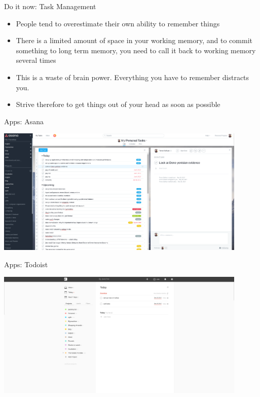 \documentclass[10pt]{beamer}
\begin{document}
\begin{frame}[c]{Do it now: Task Management}
    \begin{itemize}[<+->]
    	\item People tend to overestimate their own ability to remember things
    	\item There is a limited amount of space in your working memory, and to commit something to long term memory, you need to call it back to working memory several times
    	\item This is a waste of brain power. Everything you have to remember distracts you.
    	\item Strive therefore to get things out of your head as soon as possible

    \end{itemize}


\end{frame}

\begin{frame}[c]{Apps: Asana}

\centerline{\includegraphics[width=12cm]{figs/asana.png}}

\end{frame}

\begin{frame}[c]{Apps: Todoist}

\centerline{\includegraphics[width=12cm]{figs/todoist.png}}

\end{frame}
\end{document}
